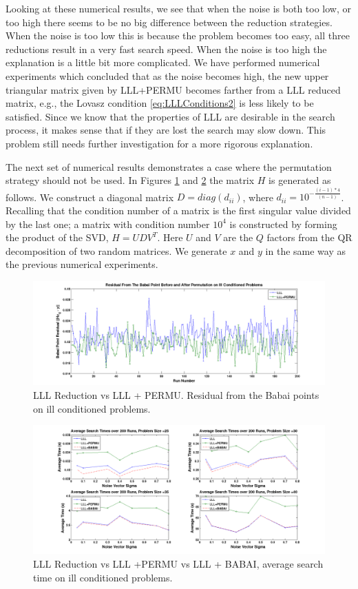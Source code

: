 \documentclass[12pt,Bold,letterpaper]{mcgilletdclass}
\begin{document}
Looking at these numerical results, we see that when the noise is both too low, or too high there seems to be no big difference between the reduction strategies. When the noise is too low this is because the problem becomes too easy, all three reductions result in a very fast search speed. When the noise is too high the explanation is a little bit more complicated. We have performed numerical experiments which concluded that as the noise becomes high, the new upper triangular matrix given by LLL+PERMU becomes farther from a LLL reduced matrix, e.g., the Lovasz condition \eqref{eq:LLLConditions2} is less likely to be satisfied. Since we know that the properties of LLL are desirable in the search process, it makes sense that if they are lost the search may slow down. This problem still needs further investigation for a more rigorous explanation.

The next set of numerical results demonstrates a case where the permutation strategy should not be used. In Figures \ref{fig:lllvspermubabaiill} and \ref{fig:lllvspermuvsbabaiill} the matrix $H$ is generated as follows.  We construct a diagonal matrix $D = diag(d_{ii})$,  where $d_{ii} = 10^{-\frac{(i-1)*4}{(n-1)}}$. Recalling that the condition number of a matrix is the first singular value divided by the last one; a  matrix with condition number $10^4$ is constructed by forming the product of the SVD, $H = UDV^T$. Here $U$ and $V$ are the $Q$ factors from the QR decomposition of two random matrices. We generate $x$ and $y$ in the same way as the previous numerical experiments.

\begin{figure}
\centering
\includegraphics[scale=0.36]{lllvspermubabaiill.png}
\caption{LLL Reduction vs LLL + PERMU. Residual from the Babai points on ill conditioned problems.}
\label{fig:lllvspermubabaiill}
\end{figure}

\begin{figure}
\centering
\includegraphics[scale=0.36]{lllvspermuvsbabaiill.png}
\caption{LLL Reduction vs LLL +PERMU vs LLL + BABAI, average search time on ill conditioned problems.}
\label{fig:lllvspermuvsbabaiill}
\end{figure}
\end{document}
